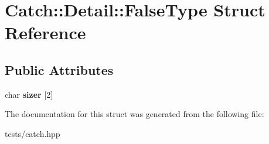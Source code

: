 \hypertarget{struct_catch_1_1_detail_1_1_false_type}{}\section{Catch\+:\+:Detail\+:\+:False\+Type Struct Reference}
\label{struct_catch_1_1_detail_1_1_false_type}
\subsection*{Public Attributes}
\begin{DoxyCompactItemize}
\item 
\mbox{\label{struct_catch_1_1_detail_1_1_false_type_abc1a730e197d6f7750ae8aaf47b63477}} 
char {\bfseries sizer} \mbox{[}2\mbox{]}
\end{DoxyCompactItemize}


The documentation for this struct was generated from the following file\+:\begin{DoxyCompactItemize}
\item 
tests/catch.\+hpp\end{DoxyCompactItemize}
